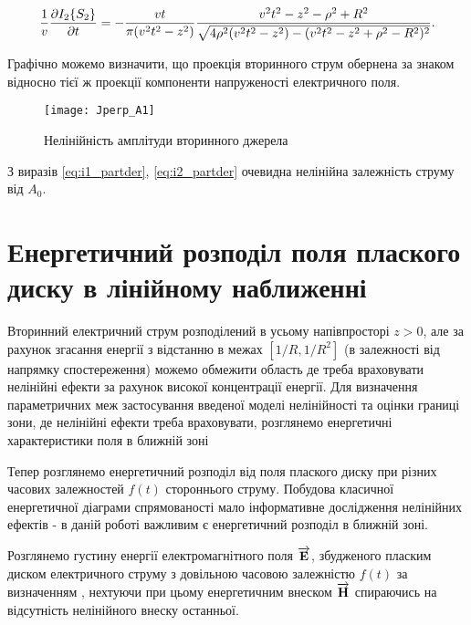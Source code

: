 %
\begin{equation} \begin{aligned} \label{eq:i2_partder}
\frac{1}{v} \frac{\partial  I_2 \{ S_2 \} }{\partial t} = 
- \frac{vt}{\pi (v^2t^2 - z^2) } \frac{ v^2t^2 - z^2 - \rho^2 + R^2 } 
{ \sqrt{ 4 \rho^2 (v^2t^2 - z^2) - (v^2t^2 - z^2 + \rho^2 - R^2)^2 } }.
\end{aligned} \end{equation}

Графічно можемо визначити, що проекція вторинного струм обернена за знаком 
відносно тієї ж проекції компоненти напруженості електричного поля.

\begin{figure}[h] \begin{center}
\texttt{[image: Jperp\_A1]}
\caption{Нелінійність амплітуди вторинного джерела}
\label{fig:jx_secondary}
\end{center} \end{figure}

З виразів \eqref{eq:i1_partder}, \eqref{eq:i2_partder} очевидна нелінійна 
залежність струму від $ A_0 $.

\section{Енергетичний розподіл поля плаского диску в лінійному наближенні}

Вторинний електричний струм розподілений в усьому напівпросторі $ z > 0 $,
але за рахунок згасання енергії з відстанню в межах $ [1/R, 1/R^2] $ (в 
залежності від напрямку спостереження) можемо обмежити область де треба 
враховувати нелінійні ефекти за рахунок високої концентрації енергії. Для 
визначення параметричних меж застосування введеної моделі нелінійності та 
оцінки границі зони, де нелінійні ефекти треба враховувати, розглянемо 
енергетичні характеристики поля в ближній зоні

Тепер розглянемо енергетичний розподіл від поля плаского диску при різних
часових залежностей $ f(t) $ стороннього струму. Побудова класичної 
енергетичної діаграми спрямованості мало інформативне дослідження нелінійних
ефектів - в даній роботі важливим є енергетичний розподіл в ближній зоні.

Розглянемо густину енергії електромагнітного поля $ \overrightarrow{\mathbf E} $, збудженого 
пласким диском електричного струму з довільною часовою залежністю $ f(t) $ за 
визначенням \cite{imp:Schantz2018}, нехтуючи при цьому енергетичним внеском 
$ \overrightarrow{\mathbf H} $ спираючись на відсутність нелінійного внеску останньої.

